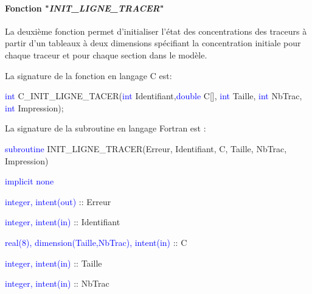\documentclass[a4paper,11pt]{article}
\begin{document}
 \paragraph{Fonction "\textit{INIT\_LIGNE\_TRACER}"\\}

 \hspace*{1cm}
 
 La deuxi\`eme fonction permet d'initialiser l'\'etat des
 concentrations des traceurs \`a partir d'un tableaux \`a deux
 dimensions sp\'ecifiant la concentration initiale pour chaque traceur
 et pour chaque section dans le mod\`ele.
 
 \vspace{0.5cm}
 
 La signature de la fonction en langage C est:
 
 \vspace{0.5cm}
 
 \textcolor{blue}{int} C\_INIT\_LIGNE\_TACER(\textcolor{blue}{int}
 Identifiant,\textcolor{blue}{double} C[], \textcolor{blue}{int}
 Taille, \textcolor{blue}{int} NbTrac, \textcolor{blue}{int} Impression);
 
 \vspace{0.5cm} 
 
 La signature de la subroutine en langage Fortran est :
 
 \vspace{0.5cm}
 
    \textcolor{blue}{subroutine} INIT\_LIGNE\_TRACER(Erreur, Identifiant, C, Taille, NbTrac, Impression)
    
        \hspace{1cm}\textcolor{blue}{implicit none}                 
        
        \hspace{1cm} \textcolor{blue}{integer, intent(out)} :: Erreur
        
        \hspace{1cm} \textcolor{blue}{integer, intent(in)}  :: Identifiant
        
        \hspace{1cm} \textcolor{blue}{real(8), dimension(Taille,NbTrac), intent(in)} :: C
        
        \hspace{1cm} \textcolor{blue}{integer, intent(in)}  :: Taille
        
        \hspace{1cm} \textcolor{blue}{integer, intent(in)}  :: NbTrac
        
\end{document}
